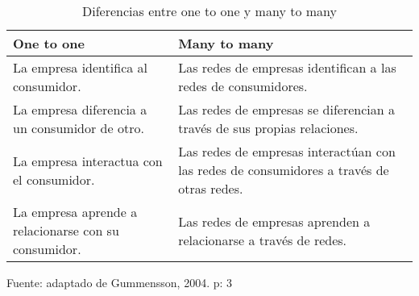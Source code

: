 \begin{table}[h]
    \caption {Diferencias entre one to one y many to many}
	\label{tab:diferencias}
	\setlength\extrarowheight{5pt}
	
	\begin{tabular}{p{7cm} p{7.5cm}}
	\toprule
	One to one                                           & Many to many                                                                             \\ 
\midrule
	La empresa identifica al consumidor.                 & Las redes de empresas identifican a las redes de consumidores.                           \\
	La empresa diferencia a un consumidor de otro.       & Las redes de empresas se diferencian a través de sus propias relaciones.                 \\
	La empresa interactua con el consumidor.             & Las redes de empresas interactúan con las redes de consumidores a través de otras redes. \\
	La empresa aprende a relacionarse con su consumidor. & Las redes de empresas aprenden a relacionarse a través de redes.                         \\ 
	\bottomrule
	\end{tabular}

	\center
	\footnotesize
	Fuente: adaptado de Gummensson, 2004. p: 3
\end{table}

